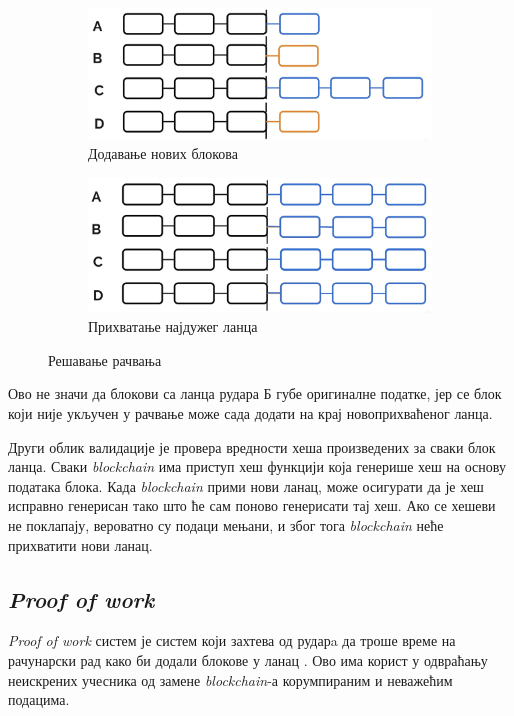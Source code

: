 \documentclass[12pt, a4paper]{article}
\begin{document}
\begin{figure}[h]
    \begin{subfigure}{0.45\linewidth}
        \includegraphics[width=\linewidth]{slike/forks-3.png}
        \caption{Додавање нових блокова}
        \label{fig:forks-c}
    \end{subfigure}
    \hfill
    \begin{subfigure}{0.45\linewidth}
        \includegraphics[width=\linewidth]{slike/forks-4.png}
        \caption{Прихватање најдужег ланца}
        \label{fig:forks-d}
    \end{subfigure}
    \caption{Решавање рачвања}
    \label{fig:combined}
\end{figure}

Ово не значи да блокови са ланца рудара Б губе оригиналне податке, јер се блок који није укључен у рачвање може сада додати на крај новоприхваћеног ланца.

Други облик валидације је провера вредности хеша произведених за сваки блок ланца. Сваки \textit{blockchain} има приступ хеш функцији која генерише хеш на основу података блока. Када \textit{blockchain} прими нови ланац, може осигурати да је хеш исправно генерисан тако што ће сам поново генерисати тај хеш. Ако се хешеви не поклапају, вероватно су подаци мењани, и због тога \textit{blockchain} неће прихватити нови ланац.


\subsection{\textit{Proof of work}}
\textit{Proof of work} систем је систем који захтева од рударa да троше време на рачунарски рад како би додали блокове у ланац \cite{10}. Ово има корист у одвраћању неискрених учесника од замене \textit{blockchain}-а корумпираним и неважећим подацима.
\end{document}
